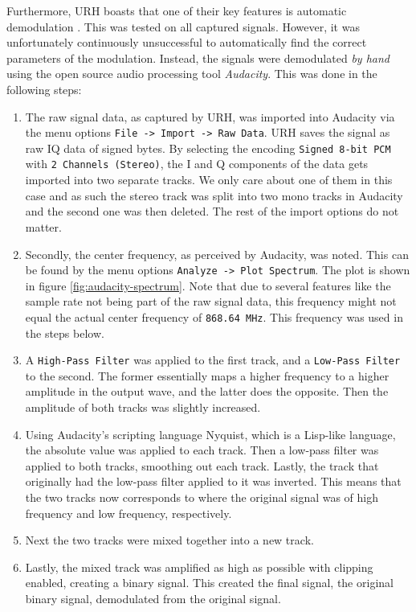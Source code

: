 Furthermore, \gls{URH} boasts that one of their key features is automatic demodulation \cite{urh}. This was tested on all captured signals. However, it was unfortunately continuously unsuccessful to automatically find the correct parameters of the modulation. Instead, the signals were demodulated \textit{by hand} using the open source audio processing tool \textit{Audacity}. This was done in the following steps:
\begin{enumerate}
    \item The raw signal data, as captured by URH, was imported into Audacity via the menu options \texttt{File -> Import -> Raw Data}. URH saves the signal as raw IQ data of signed bytes. By selecting the encoding \texttt{Signed 8-bit PCM} with \texttt{2 Channels (Stereo)}, the I and Q components of the data gets imported into two separate tracks. We only care about one of them in this case and as such the stereo track was split into two mono tracks in Audacity and the second one was then deleted. The rest of the import options do not matter.
    \item Secondly, the center frequency, as perceived by Audacity, was noted. This can be found by the menu options \texttt{Analyze -> Plot Spectrum}. The plot is shown in figure \ref{fig:audacity-spectrum}. Note that due to several features like the sample rate not being part of the raw signal data, this frequency might not equal the actual center frequency of \texttt{868.64 MHz}. This frequency was used in the steps below.
    \item A \texttt{High-Pass Filter} was applied to the first track, and a \texttt{Low-Pass Filter} to the second. The former essentially maps a higher frequency to a higher amplitude in the output wave, and the latter does the opposite. Then the amplitude of both tracks was slightly increased.
    \item Using Audacity's scripting language Nyquist, which is a Lisp-like language, the absolute value was applied to each track. Then a low-pass filter was applied to both tracks, smoothing out each track. Lastly, the track that originally had the low-pass filter applied to it was inverted. This means that the two tracks now corresponds to where the original signal was of high frequency and low frequency, respectively.
    \item Next the two tracks were mixed together into a new track.
    \item Lastly, the mixed track was amplified as high as possible with clipping enabled, creating a binary signal. This created the final signal, the original binary signal, demodulated from the original signal.
\end{enumerate}
